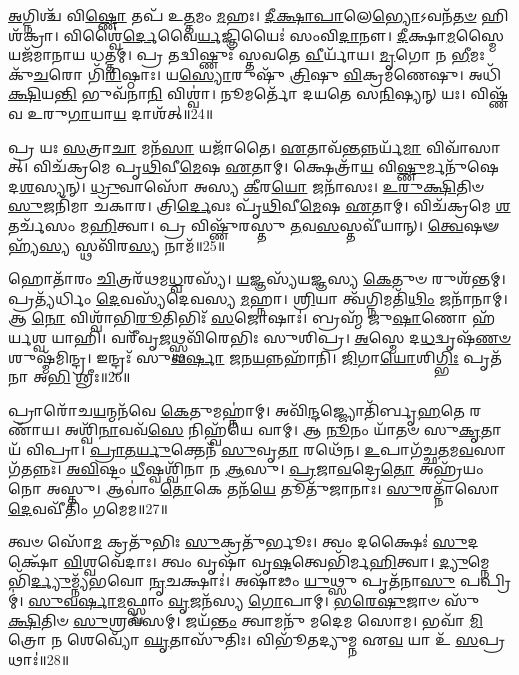 \-\ul{𑌅}\-𑌗𑍍𑌨𑌿𑌶𑍍𑌚᳴ 𑌵𑌿\-\ul{𑌷𑍍𑌣𑍋} 𑌤𑌪᳴ 𑌉\-\ul{𑌤𑍍𑌤}\-𑌮𑌂 \ul{𑌮}\-𑌹𑌃।
\-\ul{𑌦𑍀}\-\-\ul{𑌕𑍍𑌷𑌾}\-\-\ul{𑌪𑌾}\-𑌲𑍇\-\ul{𑌭𑍍𑌯𑍋}\-\-𑌽𑌵𑌨᳴\-\ul{𑌤}\-\-\ul{𑍞} 𑌹𑌿 𑌶᳴𑌕𑍍𑌰𑌾।
𑌵𑌿𑌶𑍍𑌵𑍈॑\-\ul{𑌰𑍍𑌦𑍇}\-𑌵𑍈\-\ul{𑌰𑍍𑌯}\-𑌜𑍍𑌞𑌿𑌯𑍈𑌃॑ 𑌸𑌂𑌵𑌿\-\ul{𑌦𑌾}\-𑌨𑍗।
\-\ul{𑌦𑍀}\-𑌕𑍍𑌷𑌾\-\ul{𑌮}\-𑌸𑍍𑌮𑍈 𑌯𑌜᳴𑌮𑌾𑌨𑌾𑌯 𑌧𑌤𑍍𑌤𑌮𑍍।
𑌪𑍍𑌰 𑌤𑌦𑍍𑌵𑌿𑌷𑍍𑌣𑍁𑌃᳴ 𑌸𑍍𑌤𑌵𑌤𑍇 \ul{𑌵𑍀}\-𑌰𑍍𑌯𑌾᳴𑌯।
\-\ul{𑌮𑍃}\-𑌗𑍋 𑌨 \ul{𑌭𑍀}\-𑌮𑌃 𑌕𑍁᳴\-\ul{𑌚}\-𑌰𑍋 𑌗𑌿᳴\-\ul{𑌰𑌿}\-𑌷𑍍𑌠𑌾𑌃।
𑌯\-\ul{𑌸𑍍𑌯𑍋}\-𑌰𑍁𑌷𑍁᳴ \ul{𑌤𑍍𑌰𑌿}\-𑌷𑍁 \ul{𑌵𑌿}\-𑌕𑍍𑌰𑌮᳴𑌣𑍇𑌷𑍁।
𑌅𑌧𑌿᳴ \ul{𑌕𑍍𑌷𑌿}\-𑌯\-\ul{𑌨𑍍𑌤𑌿} 𑌭𑍁𑌵᳴𑌨𑌾\-\ul{𑌨𑌿} 𑌵𑌿𑌶𑍍𑌵𑌾॑।
𑌨𑍂𑌮𑌰𑍍𑌤𑍋᳴ 𑌦𑌯𑌤𑍇 𑌸\-\ul{𑌨𑌿}\-𑌷𑍍𑌯𑌨𑍍 𑌯𑌃।
𑌵𑌿𑌷𑍍𑌣᳴𑌵 𑌉𑌰𑍁\-\ul{𑌗𑌾}\-𑌯𑌾\-\ul{𑌯} 𑌦𑌾𑌶᳴𑌤𑍍॥24॥

𑌪𑍍𑌰 𑌯𑌃 \ul{𑌸}\-𑌤𑍍𑌰𑌾\-\ul{𑌚𑌾} 𑌮𑌨᳴\-\ul{𑌸𑌾} 𑌯𑌜𑌾᳴𑌤𑍈।
\-\ul{𑌏}\-𑌤𑌾𑌵᳴\-\ul{𑌨𑍍𑌤}\-𑌨𑍍𑌨𑌰𑍍𑌯᳴\-\ul{𑌮𑌾} 𑌵𑌿𑌵𑌾᳴𑌸𑌾𑌤𑍍।
𑌵𑌿𑌚᳴𑌕𑍍𑌰𑌮𑍇 𑌪𑍃\-\ul{𑌥𑌿}\-𑌵𑍀\-\ul{𑌮𑍇}\-𑌷 \ul{𑌏}\-𑌤𑌾𑌮𑍍।
𑌕𑍍𑌷𑍇𑌤𑍍𑌰𑌾᳴\-\ul{𑌯} 𑌵𑌿\-\ul{𑌷𑍍𑌣𑍁}\-𑌰𑍍𑌮𑌨𑍁᳴𑌷𑍇 𑌦\-\ul{𑌶}\-𑌸𑍍𑌯𑌨𑍍।
\-\ul{𑌧𑍍𑌰𑍁}\-𑌵𑌾𑌸𑍋᳴ 𑌅𑌸𑍍𑌯 \ul{𑌕𑍀}\-𑌰\-\ul{𑌯𑍋} 𑌜𑌨𑌾᳴𑌸𑌃।
\-\ul{𑌉}\-\-\ul{𑌰𑍁}\-\-\ul{𑌕𑍍𑌷𑌿}\-𑌤𑌿𑍞 \ul{𑌸𑍁}\-𑌜𑌨𑌿᳴𑌮𑌾 𑌚𑌕𑌾𑌰।
𑌤𑍍𑌰𑌿\-\ul{𑌰𑍍𑌦𑍇}\-𑌵𑌃 𑌪𑍃᳴\-\ul{𑌥𑌿}\-𑌵𑍀\-\ul{𑌮𑍇}\-𑌷 \ul{𑌏}\-𑌤𑌾𑌮𑍍।
𑌵𑌿𑌚᳴𑌕𑍍𑌰𑌮𑍇 \ul{𑌶}\-𑌤𑌰𑍍𑌚᳴𑌸𑌂 𑌮\-\ul{𑌹𑌿}\-𑌤𑍍𑌵𑌾।
𑌪𑍍𑌰 𑌵𑌿𑌷𑍍𑌣𑍁᳴𑌰𑌸𑍍𑌤𑍁 \ul{𑌤}\-𑌵\-\ul{𑌸}\-𑌸𑍍𑌤𑌵𑍀᳴𑌯𑌾𑌨𑍍।
\-\ul{𑌤𑍍𑌵𑍇}\-𑌷𑍟 𑌹𑍍𑌯᳴\-\ul{𑌸𑍍𑌯} 𑌸𑍍𑌥𑌵𑌿᳴𑌰\-\ul{𑌸𑍍𑌯} 𑌨𑌾𑌮᳴॥25॥

𑌹𑍋𑌤𑌾᳴𑌰𑌂 \ul{𑌚𑌿}\-𑌤𑍍𑌰𑌰᳴𑌥𑌮\-\ul{𑌧𑍍𑌵}\-𑌰𑌸𑍍𑌯᳴।
\-\ul{𑌯}\-𑌜𑍍𑌞𑌸𑍍𑌯᳴𑌯𑌜𑍍𑌞𑌸𑍍𑌯 \ul{𑌕𑍇}\-𑌤𑍁𑍞 𑌰𑍁𑌶᳴𑌨𑍍𑌤𑌮𑍍।
𑌪𑍍𑌰𑌤𑍍𑌯᳴𑌰𑍍𑌧𑌿𑌂 \ul{𑌦𑍇}\-𑌵𑌸𑍍𑌯᳴𑌦𑍇𑌵𑌸𑍍𑌯 \ul{𑌮}\-𑌹𑍍𑌨𑌾।
\-\ul{𑌶𑍍𑌰𑌿}\-𑌯𑌾 𑌤𑍍𑌵᳴𑌗𑍍𑌨𑌿𑌮𑌤𑌿᳴\-\ul{𑌥𑌿𑌂} 𑌜𑌨𑌾᳴𑌨𑌾𑌮𑍍।
𑌆 \ul{𑌨𑍋} 𑌵𑌿𑌶𑍍𑌵𑌾᳴𑌭𑌿\-\ul{𑌰𑍂}\-𑌤𑌿𑌭𑌿𑌃᳴ \ul{𑌸}\-𑌜𑍋𑌷𑌾𑌃॑।
𑌬𑍍𑌰𑌹𑍍𑌮᳴ 𑌜𑍁\-\ul{𑌷𑌾}\-𑌣𑍋 𑌹᳴𑌰𑍍𑌯𑌶𑍍𑌵 𑌯𑌾𑌹𑌿।
𑌵𑌰𑍀᳴𑌵𑍃\-\ul{𑌜}\-𑌥𑍍𑌸𑍍𑌥𑌵𑌿᳴𑌰𑍇𑌭𑌿𑌃 𑌸𑍁𑌶𑌿𑌪𑍍𑌰।
\-\ul{𑌅}\-𑌸𑍍𑌮𑍇 𑌦\-\ul{𑌧}\-𑌦𑍍𑌵𑍃𑌷᳴\-\ul{𑌣}\-\-\ul{𑍞} 𑌶𑍁𑌷𑍍𑌮᳴𑌮𑌿𑌨𑍍𑌦𑍍𑌰।
𑌇𑌨𑍍𑌦𑍍𑌰𑌃᳴ 𑌸𑍁\-\ul{𑌵}\-\-\ul{𑌰𑍍}\-𑌷𑌾 \ul{𑌜}\-𑌨\-\ul{𑌯}\-𑌨𑍍𑌨𑌹𑌾᳴𑌨𑌿।
\-\ul{𑌜𑌿}\-𑌗𑌾\-\ul{𑌯𑍋}\-𑌶𑌿\-\ul{𑌗𑍍𑌭𑌿𑌃} 𑌪𑍃𑌤᳴𑌨𑌾 𑌅\-\ul{𑌭𑌿} 𑌶𑍍𑌰𑍀𑌃॥26॥

𑌪𑍍𑌰𑌾𑌰𑍋᳴𑌚\-\ul{𑌯}\-𑌨𑍍𑌮𑌨᳴𑌵𑍇 \ul{𑌕𑍇}\-𑌤𑍁𑌮𑌹𑍍𑌨𑌾॑𑌮𑍍।
𑌅𑌵𑌿᳴\-\ul{𑌨𑍍𑌦}\-𑌜𑍍𑌜𑍍𑌯𑍋𑌤𑌿᳴𑌰𑍍𑌬𑍃\-\ul{𑌹}\-𑌤𑍇 𑌰𑌣𑌾᳴𑌯।
𑌅𑌶𑍍𑌵𑌿᳴\-\ul{𑌨𑌾}\-𑌵𑌵᳴\-\ul{𑌸𑍇} 𑌨𑌿𑌹𑍍𑌵᳴𑌯𑍇 𑌵𑌾𑌮𑍍।
𑌆 \ul{𑌨𑍂}\-𑌨𑌂 𑌯𑌾᳴𑌤𑍞 𑌸𑍁\-\ul{𑌕𑍃}\-𑌤𑌾𑌯᳴ 𑌵𑌿𑌪𑍍𑌰𑌾।
\-\ul{𑌪𑍍𑌰𑌾}\-\-\ul{𑌤}\-\-\ul{𑌰𑍍𑌯𑍁}\-𑌕𑍍𑌤𑍇𑌨᳴ \ul{𑌸𑍁}\-𑌵𑍃\-\ul{𑌤𑌾} 𑌰𑌥𑍇᳴𑌨।
\-\ul{𑌉}\-𑌪𑌾𑌗᳴𑌚𑍍𑌛\-\ul{𑌤}\-𑌮\-\ul{𑌵}\-𑌸𑌾𑌗᳴𑌤𑌨𑍍𑌨𑌃।
\-\ul{𑌅}\-\-\ul{𑌵𑌿}\-𑌷𑍍𑌟𑌂 \ul{𑌧𑍀}\-𑌷𑍍𑌵𑌶𑍍𑌵𑌿᳴𑌨𑌾 𑌨 \ul{𑌆}\-𑌸𑍁।
\-\ul{𑌪𑍍𑌰}\-𑌜𑌾\-\ul{𑌵}\-𑌦𑍍𑌰𑍇\-\ul{𑌤𑍋} 𑌅𑌹𑍍𑌰᳴𑌯𑌂 𑌨𑍋 𑌅𑌸𑍍𑌤𑍁।
𑌆𑌵𑌾𑌂॑ \ul{𑌤𑍋}\-𑌕𑍇 𑌤𑌨᳴\-\ul{𑌯𑍇} 𑌤𑍂𑌤𑍁᳴𑌜𑌾𑌨𑌾𑌃।
\-\ul{𑌸𑍁}\-𑌰𑌤𑍍𑌨𑌾᳴𑌸𑍋 \ul{𑌦𑍇}\-𑌵𑌵𑍀᳴𑌤𑌿𑌂 𑌗𑌮𑍇𑌮॥27॥

𑌤𑍍𑌵𑍞 𑌸𑍋᳴\-\ul{𑌮} 𑌕𑍍𑌰𑌤𑍁᳴𑌭𑌿𑌃 \ul{𑌸𑍁}\-𑌕𑍍𑌰𑌤𑍁᳴𑌰𑍍𑌭𑍂𑌃।
𑌤𑍍𑌵𑌂 𑌦𑌕𑍍𑌷𑍈𑌃॑ \ul{𑌸𑍁}\-𑌦𑌕𑍍𑌷𑍋᳴ \ul{𑌵𑌿}\-𑌶𑍍𑌵𑌵𑍇᳴𑌦𑌾𑌃।
𑌤𑍍𑌵𑌂 𑌵𑍃𑌷𑌾᳴ 𑌵𑍃\-\ul{𑌷}\-𑌤𑍍𑌵𑍇𑌭𑌿᳴𑌰𑍍𑌮\-\ul{𑌹𑌿}\-𑌤𑍍𑌵𑌾।
\-\ul{𑌦𑍍𑌯𑍁}\-𑌮𑍍𑌨𑍇𑌭𑌿᳴\-\ul{𑌰𑍍𑌦𑍍𑌯𑍁}\-𑌮𑍍𑌨𑍍𑌯᳴𑌭𑌵𑍋 \ul{𑌨𑍃}\-𑌚𑌕𑍍𑌷𑌾𑌃॑।
𑌅𑌷𑌾᳴𑌢𑌂 \ul{𑌯𑍁}\-𑌥𑍍𑌸𑍁 𑌪𑍃𑌤᳴𑌨𑌾\-\ul{𑌸𑍁} 𑌪𑌪𑍍𑌰𑌿𑌮𑍍॑।
\-\ul{𑌸𑍁}\-\-\ul{𑌵}\-\-\ul{𑌰𑍍}\-𑌷𑌾\-\ul{𑌮}\-𑌫𑍍𑌸𑍍𑌵𑌾𑌂 \ul{𑌵𑍃}\-𑌜𑌨᳴𑌸𑍍𑌯 \ul{𑌗𑍋}\-𑌪𑌾𑌮𑍍।
\-\ul{𑌭}\-\-\ul{𑌰𑍇}\-\-\ul{𑌷𑍁}\-𑌜𑌾𑍞 𑌸𑍁᳴\-\ul{𑌕𑍍𑌷𑌿}\-𑌤𑌿𑍞 \ul{𑌸𑍁}\-𑌶𑍍𑌰𑌵᳴𑌸𑌮𑍍।
𑌜𑌯᳴\-\ul{𑌨𑍍𑌤𑌂} 𑌤𑍍𑌵𑌾𑌮𑌨𑍁᳴ 𑌮𑌦𑍇𑌮 𑌸𑍋𑌮।
𑌭𑌵𑌾᳴ \ul{𑌮𑌿}\-𑌤𑍍𑌰𑍋 𑌨 𑌶𑍇𑌵𑍍𑌯𑍋᳴ \ul{𑌘𑍃}\-𑌤𑌾𑌸𑍁᳴𑌤𑌿𑌃।
𑌵𑌿𑌭𑍂᳴𑌤𑌦𑍍𑌯𑍁𑌮𑍍𑌨 𑌏\-\ul{𑌵} 𑌯𑌾 𑌉᳴ \ul{𑌸}\-𑌪𑍍𑌰𑌥𑌾𑌃॑॥28॥

